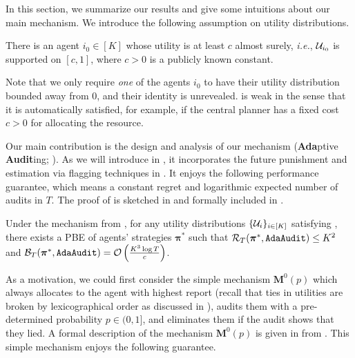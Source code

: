 In this section, we summarize our results and give some intuitions about our main mechanism. We introduce the following assumption on utility distributions.

\begin{assumption}\label{assumption:min report}
There is an agent $i_0\in[K]$ whose utility is at least $c$ almost surely, \textit{i.e.}, $\mathcal{U}_{i_0}$ is supported on $[c,1]$, where $c>0$ is a publicly known constant.
\end{assumption}

Note that we only require \textit{one} of the agents $i_0$ to have their utility distribution bounded away from $0$, and their identity is unrevealed.  is weak in the sense that it is automatically satisfied, for example, if the central planner has a fixed cost $c>0$ for allocating the resource. 

Our main contribution is the design and analysis of our mechanism \mechname (\textbf{Ada}ptive \textbf{Audit}ing; ). As we will introduce in , it incorporates the future punishment and estimation via flagging techniques in .
It enjoys the following performance guarantee, which means a constant regret and logarithmic expected number of audits in $T$. The proof of  is sketched in  and formally included in .

\begin{theorem}\label{thm:deterministic main thm}
Under the mechanism \mechname from , for any utility distributions $\{\mathcal{U}_i\}_{i\in[K]}$ satisfying , there exists a PBE of agents' strategies $\bm \pi^\ast$ such that $\mathcal R_T(\bm \pi^\ast,\texttt{AdaAudit})\leq K^2$ and $\mathcal B_T(\bm \pi^\ast,\texttt{AdaAudit})= \operatorname{\mathcal O}\left (\frac{K^3\log T}{c}\right )$.
\end{theorem}

As a motivation, we could first consider the simple mechanism $\bm M^0(p)$ which always allocates to the agent with highest report (recall that ties in utilities are broken by lexicographical order as discussed in ), audits them with a pre-determined probability $p\in (0,1]$, and eliminates them if the audit shows that they lied. A formal description of the mechanism $\bm M^0(p)$ is given in  from . This simple mechanism enjoys the following guarantee.

